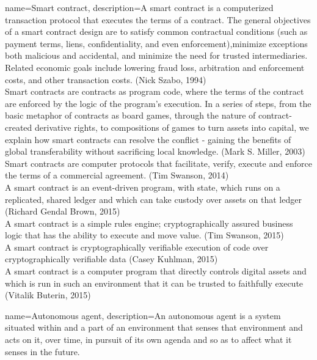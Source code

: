 \documentclass[a4paper, 12pt]{scrartcl}
\begin{document}
{
  name={Smart contract},
  description={A smart contract is a computerized transaction protocol that executes the terms of a contract. The general objectives of a smart contract design are to satisfy common contractual conditions (such as payment terms, liens, confidentiality, and even enforcement),minimize exceptions both malicious and accidental, and minimize the need for trusted intermediaries. Related economic goals include lowering fraud loss, arbitration and enforcement costs, and other transaction costs. (Nick Szabo, 1994)\\

  Smart contracts are contracts as program code, where the terms of the contract are enforced by the logic of the program's execution. In a series of steps, from the basic metaphor of contracts as board games, through the nature of contract-created derivative rights, to compositions of games to turn assets into capital, we explain how smart contracts can resolve the conflict - gaining the benefits of global transferability without sacrificing local knowledge. (Mark S. Miller, 2003) \\

  Smart contracts are computer protocols that facilitate, verify, execute and enforce the terms of a commercial agreement. (Tim Swanson, 2014) \\

  A smart contract is an event-driven program, with state, which runs on a replicated, shared ledger and which can take custody over assets on that ledger (Richard Gendal Brown, 2015)\\

  A smart contract is a simple rules engine; cryptographically assured business logic that has the ability to execute and move value. (Tim Swanson, 2015)\\

  A smart contract is cryptographically verifiable execution of code over cryptographically verifiable data (Casey Kuhlman, 2015)\\

  A smart contract is a computer program that directly controls digital assets and which is run in such an environment that it can be trusted to faithfully execute (Vitalik Buterin, 2015)}
}

 {
	name={Autonomous agent},
	description={An autonomous agent is a system situated within and a part of an environment that senses that environment and acts on it, over time, in pursuit of its own agenda and so as to affect what it senses in the future. }
}
\printglossaries
\end{document}
